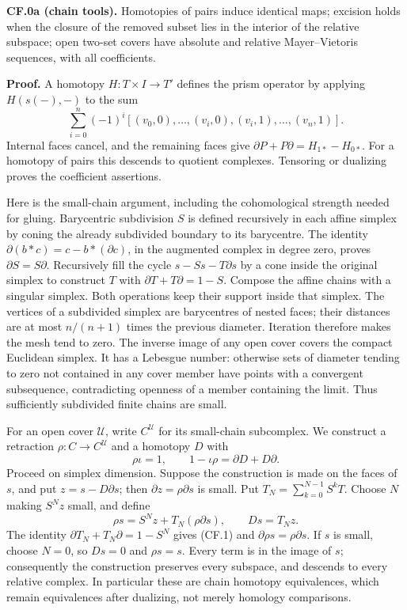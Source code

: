 \documentclass[
  11pt,
]{article}
\begin{document}
\textbf{CF.0a (chain tools).} Homotopies of pairs induce identical maps;
excision holds when the closure of the removed subset lies in the
interior of the relative subspace; open two-set covers have absolute and
relative Mayer--Vietoris sequences, with all coefficients.

\textbf{Proof.} A homotopy \(H:T\times I\to T'\) defines the prism
operator by applying \(H(s(-),-)\) to the sum \[
\sum_{i=0}^n(-1)^i
[(v_0,0),\ldots,(v_i,0),(v_i,1),\ldots,(v_n,1)].
\] Internal faces cancel, and the remaining faces give
\(\partial P+P\partial=H_{1*}-H_{0*}\). For a homotopy of pairs this
descends to quotient complexes. Tensoring or dualizing proves the
coefficient assertions.

Here is the small-chain argument, including the cohomological strength
needed for gluing. Barycentric subdivision \(S\) is defined recursively
in each affine simplex by coning the already subdivided boundary to its
barycentre. The identity \(\partial(b*c)=c-b*(\partial c)\), in the
augmented complex in degree zero, proves \(\partial S=S\partial\).
Recursively fill the cycle \(s-Ss-T\partial s\) by a cone inside the
original simplex to construct \(T\) with \(\partial T+T\partial=1-S\).
Compose the affine chains with a singular simplex. Both operations keep
their support inside that simplex. The vertices of a subdivided simplex
are barycentres of nested faces; their distances are at most \(n/(n+1)\)
times the previous diameter. Iteration therefore makes the mesh tend to
zero. The inverse image of any open cover covers the compact Euclidean
simplex. It has a Lebesgue number: otherwise sets of diameter tending to
zero not contained in any cover member have points with a convergent
subsequence, contradicting openness of a member containing the limit.
Thus sufficiently subdivided finite chains are small.

For an open cover \(\mathcal U\), write \(C^{\mathcal U}\) for its
small-chain subcomplex. We construct a retraction
\(\rho:C\to C^{\mathcal U}\) and a homotopy \(D\) with \[
\rho\iota=1,\qquad 1-\iota\rho=\partial D+D\partial.
\tag{CF.1}
\] Proceed on simplex dimension. Suppose the construction is made on the
faces of \(s\), and put \(z=s-D\partial s\); then
\(\partial z=\rho\partial s\) is small. Put
\(T_N=\sum_{k=0}^{N-1}S^kT\). Choose \(N\) making \(S^Nz\) small, and
define \[
\rho s=S^Nz+T_N(\rho\partial s),\qquad Ds=T_Nz.
\] The identity \(\partial T_N+T_N\partial=1-S^N\) gives (CF.1) and
\(\partial\rho s=\rho\partial s\). If \(s\) is small, choose \(N=0\), so
\(Ds=0\) and \(\rho s=s\). Every term is in the image of \(s\);
consequently the construction preserves every subspace, and descends to
every relative complex. In particular these are chain homotopy
equivalences, which remain equivalences after dualizing, not merely
homology comparisons.
\end{document}
